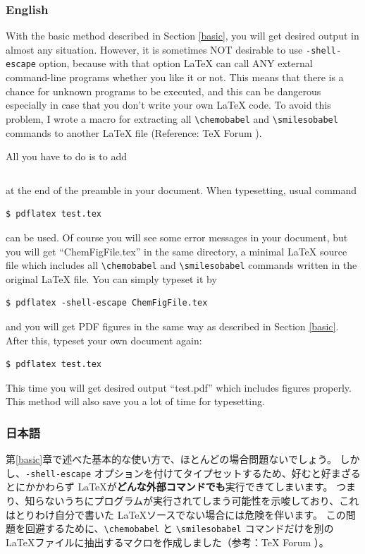 \documentclass[12pt]{jsarticle}
\begin{document}
\subsubsection{English}

With the basic method described in Section \ref{basic}, you will get desired output in almost any situation.
However, it is sometimes NOT desirable to use \verb|-shell-escape| option,
because with that option {\LaTeX} can call ANY external command-line programs whether you like it or not.
This means that there is a chance for unknown programs to be executed,
and this can be dangerous especially in case that you don't write your own {\LaTeX} code.
To avoid this problem, I wrote a macro for extracting all \verb|\chemobabel| and \verb|\smilesobabel| commands to another {\LaTeX} file (Reference: {\TeX} Forum \cite{OKU}).

All you have to do is to add
\begin{verbatim}

\end{verbatim}
at the end of the preamble in your document. When typesetting, usual command
\begin{verbatim}
$ pdflatex test.tex
\end{verbatim}
can be used. Of course you will see some error messages in your document, but you will get ``ChemFigFile.tex'' in the same directory, a minimal {\LaTeX} source file which includes all \verb|\chemobabel| and \verb|\smilesobabel| commands written in the original {\LaTeX} file.
You can simply typeset it by
\begin{verbatim}
$ pdflatex -shell-escape ChemFigFile.tex
\end{verbatim}
and you will get PDF figures in the same way as described in Section \ref{basic}.
After this, typeset your own document again:
\begin{verbatim}
$ pdflatex test.tex
\end{verbatim}
This time you will get desired output ``test.pdf'' which includes figures properly.
This method will also save you a lot of time for typesetting.

\clearpage

\subsubsection{日本語}

第\ref{basic}章で述べた基本的な使い方で、ほとんどの場合問題ないでしょう。
しかし、\verb|-shell-escape| オプションを付けてタイプセットするため、好むと好まざるとにかかわらず \LaTeX が\textbf{どんな外部コマンドでも}実行できてしまいます。
つまり、知らないうちにプログラムが実行されてしまう可能性を示唆しており、これはとりわけ自分で書いた \LaTeX ソースでない場合には危険を伴います。
この問題を回避するために、\verb|\chemobabel| と \verb|\smilesobabel| コマンドだけを別の \LaTeX ファイルに抽出するマクロを作成しました（参考：{\TeX} Forum \cite{OKU}）。
\end{document}
